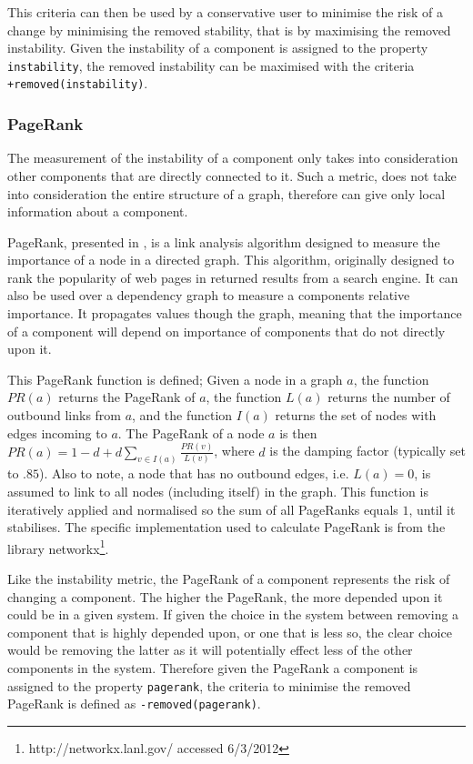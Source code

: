 This criteria can then be used by a conservative user to minimise the risk of a change by minimising the removed stability,
that is by maximising the removed instability.
Given the instability of a component is assigned to the property \verb+instability+,
the removed instability can be maximised with the criteria \verb!+removed(instability)!.

\subsubsection{PageRank}
The measurement of the instability of a component only takes into consideration other components that are directly connected to it.
Such a metric, does not take into consideration the entire structure of a graph, therefore can give only local information about a component.

PageRank, presented in \citep{page1998}, is a link analysis algorithm designed to measure the importance of a node in a directed graph.
This algorithm, originally designed to rank the popularity of web pages in returned results from a search engine.
It can also be used over a dependency graph to measure a components relative importance.
It propagates values though the graph, meaning that the importance of a component will depend on importance of components that do not directly upon it. 

This PageRank function is defined;
Given a node in a graph $a$, the function $PR(a)$ returns the PageRank of $a$, 
the function $L(a)$ returns the number of outbound links from $a$, 
and the function $I(a)$ returns the set of nodes with edges incoming to $a$.
The PageRank of a node $a$ is then $PR(a) = 1-d + d\sum\limits_{v \in I(a)} \frac{PR(v)}{L(v)}$,
where $d$ is the damping factor (typically set to $.85$).
Also to note, a node that has no outbound edges, i.e. $L(a) = 0$, is assumed to link to all nodes (including itself) in the graph.
This function is iteratively applied and normalised so the sum of all PageRanks equals $1$, until it stabilises.
The specific implementation used to calculate PageRank is from the library networkx\footnote{http://networkx.lanl.gov/ accessed 6/3/2012}.

Like the instability metric, the PageRank of a component represents the risk of changing a component.
The higher the PageRank, the more depended upon it could be in a given system.
If given the choice in the system between removing a component that is highly depended upon, or one that is less so,
the clear choice would be removing the latter as it will potentially effect less of the other components in the system.
Therefore given the PageRank a component is assigned to the property \verb+pagerank+, the criteria to minimise the removed PageRank is defined as \verb!-removed(pagerank)!.


